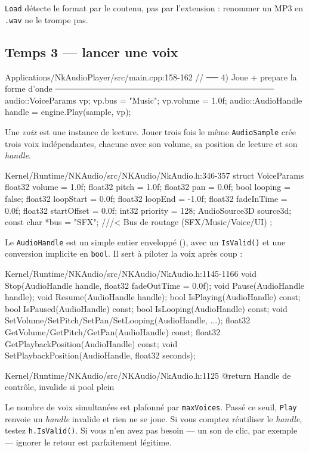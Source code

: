 \texttt{Load} détecte le format par le contenu, pas par l'extension : renommer un
MP3 en \texttt{.wav} ne le trompe pas.

\subsection{Temps 3 — lancer une voix}

\begin{nkcode}{Applications/NkAudioPlayer/src/main.cpp:158-162}
    // ── 4) Joue + prepare la forme d'onde ─────────────────────────────────────
    audio::VoiceParams vp;
    vp.bus = "Music";
    vp.volume = 1.0f;
    audio::AudioHandle handle = engine.Play(sample, vp);
\end{nkcode}

Une \emph{voix} est une instance de lecture. Jouer trois fois le même
\texttt{AudioSample} crée trois voix indépendantes, chacune avec son volume, sa
position de lecture et son \emph{handle}.

\begin{nkcode}{Kernel/Runtime/NKAudio/src/NKAudio/NkAudio.h:346-357}
    struct VoiceParams {
            float32 volume = 1.0f;      float32 pitch = 1.0f;    float32 pan = 0.0f;
            bool looping = false;       float32 loopStart = 0.0f; float32 loopEnd = -1.0f;
            float32 fadeInTime = 0.0f;  float32 startOffset = 0.0f;
            int32 priority = 128;
            AudioSource3D source3d;
            const char *bus = "SFX";    ///< Bus de routage (SFX/Music/Voice/UI)
    };
\end{nkcode}

Le \texttt{AudioHandle} est un simple entier enveloppé
(), avec un \texttt{IsValid()} et une conversion
implicite en \texttt{bool}. Il sert à piloter la voix après coup :

\begin{nkcode}{Kernel/Runtime/NKAudio/src/NKAudio/NkAudio.h:1145-1166}
void Stop(AudioHandle handle, float32 fadeOutTime = 0.0f);
void Pause(AudioHandle handle);  void Resume(AudioHandle handle);
bool IsPlaying(AudioHandle) const; bool IsPaused(AudioHandle) const; bool IsLooping(AudioHandle) const;
void SetVolume/SetPitch/SetPan/SetLooping(AudioHandle, ...);
float32 GetVolume/GetPitch/GetPan(AudioHandle) const;
float32 GetPlaybackPosition(AudioHandle) const;
void    SetPlaybackPosition(AudioHandle, float32 seconds);
\end{nkcode}

\begin{nkpiege}
\begin{nkcode}{Kernel/Runtime/NKAudio/src/NKAudio/NkAudio.h:1125}
 @return Handle de contrôle, invalide si pool plein
\end{nkcode}
Le nombre de voix simultanées est plafonné par \texttt{maxVoices}. Passé ce
seuil, \texttt{Play} renvoie un \emph{handle} invalide et rien ne se joue. Si
vous comptez réutiliser le \emph{handle}, testez \texttt{h.IsValid()}. Si vous
n'en avez pas besoin — un son de clic, par exemple — ignorer le retour est
parfaitement légitime.
\end{nkpiege}

